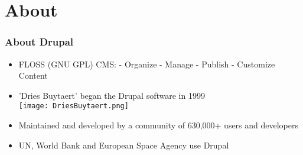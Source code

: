 \section{About}

\begin{frame}[allowframebreaks]
\frametitle{About Drupal}

\begin{itemize}
	\item FLOSS (GNU GPL) CMS: \linebreak
	- Organize\linebreak
	- Manage\linebreak
	- Publish\linebreak
	- Customize Content
	\item 'Dries Buytaert' began the Drupal software in 1999\\
	\texttt{[image: DriesBuytaert.png]}
	\item Maintained and developed by a community of 630,000+ users and developers
	\item UN, World Bank and European Space Agency use Drupal
\end{itemize}

\end{frame}
